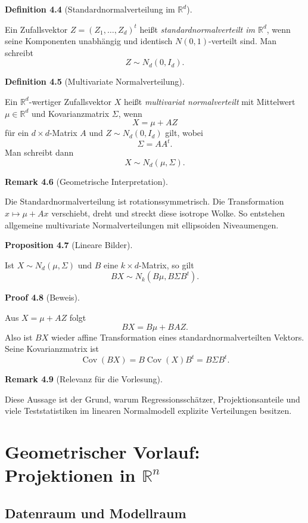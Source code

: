 \documentclass[10pt, letterpaper]{article}
\newcommand{\R}{\mathbb{R}}
\newcommand{\CustomHeading}[3]{%
  \par\medskip\noindent%
  \textbf{#1 #2} \textnormal{(#3)}.\enskip%
}
\newenvironment{DEF}[2]{\CustomHeading{Definition}{#1}{#2}}{}
\newenvironment{PROP}[2]{\CustomHeading{Proposition}{#1}{#2}}{}
\newenvironment{REM}[2]{\CustomHeading{Remark}{#1}{#2}}{}
\newenvironment{PROOF}[2]{\CustomHeading{Proof}{#1}{#2}}{}
\begin{document}
\begin{DEF}{4.4}{Standardnormalverteilung im \(\R^d\)}
Ein Zufallsvektor \(Z=(Z_1,\dots,Z_d)^t\) heißt \emph{standardnormalverteilt im \(\R^d\)}, wenn seine Komponenten unabhängig und identisch \(N(0,1)\)-verteilt sind. Man schreibt
\[
Z\sim N_d(0,I_d).
\]
\end{DEF}

\begin{DEF}{4.5}{Multivariate Normalverteilung}
Ein \(\R^d\)-wertiger Zufallsvektor \(X\) heißt \emph{multivariat normalverteilt} mit Mittelwert \(\mu\in\R^d\) und Kovarianzmatrix \(\Sigma\), wenn
\[
X=\mu + AZ
\]
für ein \(d\times d\)-Matrix \(A\) und \(Z\sim N_d(0,I_d)\) gilt, wobei
\[
\Sigma=AA^t.
\]
Man schreibt dann
\[
X\sim N_d(\mu,\Sigma).
\]
\end{DEF}

\begin{REM}{4.6}{Geometrische Interpretation}
Die Standardnormalverteilung ist rotationssymmetrisch. Die Transformation \(x\mapsto \mu+Ax\) verschiebt, dreht und streckt diese isotrope Wolke. So entstehen allgemeine multivariate Normalverteilungen mit ellipsoiden Niveaumengen.
\end{REM}

\begin{PROP}{4.7}{Lineare Bilder}
Ist \(X\sim N_d(\mu,\Sigma)\) und \(B\) eine \(k\times d\)-Matrix, so gilt
\[
BX \sim N_k(B\mu,B\Sigma B^t).
\]
\end{PROP}

\begin{PROOF}{4.8}{Beweis}
Aus \(X=\mu+AZ\) folgt
\[
BX=B\mu + BAZ.
\]
Also ist \(BX\) wieder affine Transformation eines standardnormalverteilten Vektors. Seine Kovarianzmatrix ist
\[
\operatorname{Cov}(BX)=B\operatorname{Cov}(X)B^t=B\Sigma B^t.
\]
\end{PROOF}

\begin{REM}{4.9}{Relevanz für die Vorlesung}
Diese Aussage ist der Grund, warum Regressionsschätzer, Projektionsanteile und viele Teststatistiken im linearen Normalmodell explizite Verteilungen besitzen.
\end{REM}

\section{Geometrischer Vorlauf: Projektionen in \(\R^n\)}

\subsection{Datenraum und Modellraum}
\end{document}
